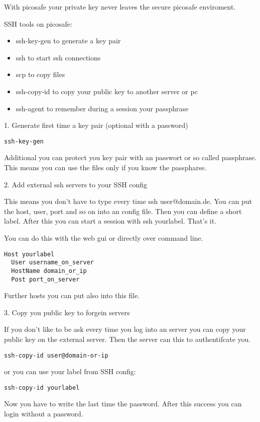 With picosafe your private key never leaves the secure picosafe enviroment.

SSH tools on picosafe:

\begin{itemize}
\item ssh-key-gen to generate a key pair
\item ssh to start ssh connections
\item scp to copy files
\item ssh-copy-id to copy your public key to another server or pc
\item ssh-agent to remember during a session your passphrase
\end{itemize}

1. Generate first time a key pair (optional with a password)

\texttt{ssh-key-gen}

Additional you can protect you key pair with an passwort or so called passphrase. This means you can use the files only if you know the passpharse. 

2. Add external ssh servers to your SSH config
 
This means you don't have to type every time ssh user@domain.de. You can put the host, user, port and so on into an config file. Then you can define a short label. After this you can start a session with ssh yourlabel. That's it. 

You can do this with the web gui or directly over command line.

\begin{lstlisting}
Host yourlabel
  User username_on_server
  HostName domain_or_ip
  Post port_on_server 

\end{lstlisting}

Further hosts you can put also into this file.

3. Copy you public key to forgein servers

If you don't like to be ask every time you log into an server you can copy your public key on the external server. Then the server can this to authentifcate you.

\texttt{ssh-copy-id user@domain-or-ip}

or you can use your label from SSH config:

\texttt{ssh-copy-id yourlabel}

Now you have to write the last time the password. After this success you can login without a password. 

